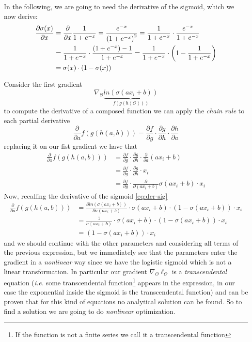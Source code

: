 In the following, we are going to need the derivative of the sigmoid, which we now derive:
\begin{align}
	\frac{\partial \sigma(x)}{\partial x} &= \frac{\partial }{\partial x} \frac{1}{1 + e^{-x}} = \frac{e^{-x}}{\left(1 + e^{-x}\right)^2} = \frac{1}{ 1 + e^{-x}} \cdot \frac{e^{-x}}{ 1 + e^{-x}} \\
	&=\frac{1}{ 1 + e^{-x}} \cdot \frac{(1 + e^{-x}) - 1}{1 + e^{-x}} = \frac{1}{ 1 + e^{-x}} \cdot \left( 1 - \frac{1}{1 + e^{-x}} \right) \\
	&= \sigma(x) \cdot \left( 1 - \sigma(x) \right) \label{eq:der-sig}
\end{align}

Consider the first gradient
\begin{equation}
	\nabla_\Theta \underbrace{ln(\sigma(ax_i+b))}_{f(g(h(\Theta)))}
\end{equation}
to compute the derivative of a composed function we can apply the \emph{chain rule} to each partial derivative
\begin{equation}
	\frac{\partial}{\partial a}f(g(h(a, b))) = \frac{\partial f}{\partial g} \cdot \frac{\partial g}{\partial h} \cdot \frac{\partial h}{\partial a}
\end{equation}
replacing it on our fist gradient we have that
\begin{align}
	\frac{\partial}{\partial a}f(g(h(a, b))) &= \frac{\partial f}{\partial g} \cdot \frac{\partial g}{\partial h} \cdot \frac{\partial}{\partial a}(ax_i + b) \\
	&= \frac{\partial f}{\partial g} \cdot \frac{\partial g}{\partial h} \cdot x_i \\
	&= \frac{\partial f}{\partial g} \cdot \frac{\partial}{\partial (ax_i+b)}\sigma(ax_i+b) \cdot x_i 
\end{align}
Now, recalling the derivative of the sigmoid \cref{eq:der-sig}
\begin{align}
	\frac{\partial}{\partial a}f(g(h(a, b))) &= \frac{\partial ln(\sigma(ax_i+b))}{\partial \sigma(ax_i+b)} \cdot \sigma(ax_i+b) \cdot \left( 1 - \sigma(ax_i+b) \right) \cdot x_i \\
	&= \frac{1}{\sigma(ax_i+b)} \cdot \sigma(ax_i+b) \cdot \left( 1 - \sigma(ax_i+b) \right) \cdot x_i \\
	&= \left( 1 - \sigma(ax_i+b) \right) \cdot x_i
\end{align}
and we should continue with the other parameters and considering all terms of the previous expression, but we immediately see that the parameters enter the gradient in a \emph{nonlinear} way since we have the logistic sigmoid which is not a linear transformation.
In particular our gradient $\nabla_\Theta\ell_\Theta$ is a \emph{transcendental} equation (\textit{i.e.} some transcendental function\footnote{If the function is not a finite series we call it a transcendental function} appears in the expression, in our case the exponential inside the sigmoid is the transcendental function) and can be proven that for this kind of equations no analytical solution can be found. So to find a solution we are going to do \emph{nonlinear} optimization.